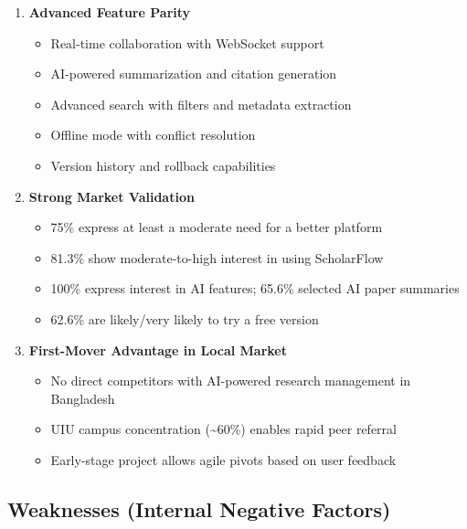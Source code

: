 \begin{enumerate}
    \item \textbf{Advanced Feature Parity}
          \begin{itemize}
              \item Real-time collaboration with WebSocket support
              \item AI-powered summarization and citation generation
              \item Advanced search with filters and metadata extraction
              \item Offline mode with conflict resolution
              \item Version history and rollback capabilities
          \end{itemize}

    \item \textbf{Strong Market Validation}
          \begin{itemize}
              \item 75\% express at least a moderate need for a better platform
              \item 81.3\% show moderate-to-high interest in using ScholarFlow
              \item 100\% express interest in AI features; 65.6\% selected AI paper summaries
              \item 62.6\% are likely/very likely to try a free version
          \end{itemize}

    \item \textbf{First-Mover Advantage in Local Market}
          \begin{itemize}
              \item No direct competitors with AI-powered research management in Bangladesh
              \item UIU campus concentration (\textasciitilde{}60\%) enables rapid peer referral
              \item Early-stage project allows agile pivots based on user feedback
          \end{itemize}
\end{enumerate}

\subsection{Weaknesses (Internal Negative Factors)}

